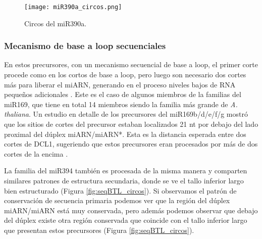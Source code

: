 \begin{figure}[htbp!] 
    \centering    
    \texttt{[image: miR390a\_circos.png]}
    \caption[Circos del miR172a]{Circos del miR390a.}
     \label{fig:miR390a_circos}
\end{figure}

\subsubsection{Mecanismo de base a loop secuenciales}

En estos precursores, con un mecanismo secuencial de base a loop, el primer corte procede como en los cortos de base a loop, pero luego son necesario dos cortes más para liberar el miARN, generando en el proceso niveles bajos de RNA pequeños adicionales \citep{Bologna2013}.
Este es el caso de algunos miembros de la  familias del miR169, que tiene en total 14 miembros siendo la familia más grande de \textit{A. thaliana}.
Un estudio en detalle de los precursores del miR169b/d/e/f/g mostró que los sitios de cortes del precursor estaban localizados 21 nt por debajo del lado proximal del dúplex miARN/miARN*.
Esta es la distancia esperada entre dos cortes de DCL1, sugeriendo que estos precursores eran procesados por más de dos cortes de la encima \citep{Bologna2013}.

La familia del miR394 también es procesada de la misma manera y comparten similares patrones de estructura secundaria, donde se ve el tallo inferior largo bien estructurado (Figura \ref{fig:seqBTL_circos}).
Si observamos el patrón de conservación de secuencia primaria podemos ver que la región del dúplex miARN/miARN está muy conservada, pero además podemos observar que debajo del dúplex existe otra región conservada que coincide con el tallo inferior largo que presentan estos precursores (Figura \ref{fig:seqBTL_circos}).


